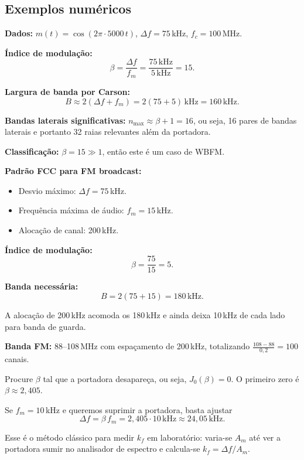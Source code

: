 \documentclass[11pt,a4paper]{article}
\begin{document}
\subsection{Exemplos numéricos}

\begin{exemplo}
\textbf{Dados:} $m(t)=\cos(2\pi\cdot 5000\,t)$, $\Delta f=75$\,kHz, $f_c=100$\,MHz.

\textbf{Índice de modulação:}
\[
  \beta = \frac{\Delta f}{f_m} = \frac{75\,\mathrm{kHz}}{5\,\mathrm{kHz}} = 15.
\]

\textbf{Largura de banda por Carson:}
\[
  B \approx 2(\Delta f + f_m) = 2(75 + 5)\,\mathrm{kHz} = 160\,\mathrm{kHz}.
\]

\textbf{Bandas laterais significativas:} $n_{\max} \approx \beta + 1 = 16$, ou seja, 16 pares de bandas laterais e portanto 32 raias relevantes além da portadora.

\textbf{Classificação:} $\beta=15\gg 1$, então este é um caso de WBFM.
\end{exemplo}

\begin{exemplo}
\textbf{Padrão FCC para FM broadcast:}
\begin{itemize}
  \item Desvio máximo: $\Delta f = 75$\,kHz.
  \item Frequência máxima de áudio: $f_m = 15$\,kHz.
  \item Alocação de canal: 200\,kHz.
\end{itemize}

\textbf{Índice de modulação:}
\[
  \beta = \frac{75}{15} = 5.
\]

\textbf{Banda necessária:}
\[
  B = 2(75+15) = 180\,\mathrm{kHz}.
\]

A alocação de 200\,kHz acomoda os 180\,kHz e ainda deixa 10\,kHz de cada lado para banda de guarda.

\textbf{Banda FM:} 88--108\,MHz com espaçamento de 200\,kHz, totalizando $\frac{108-88}{0{,}2}=100$ canais.
\end{exemplo}

\begin{exemplo}
Procure $\beta$ tal que a portadora desapareça, ou seja, $J_0(\beta)=0$. O primeiro zero é $\beta\approx 2{,}405$.

Se $f_m=10$\,kHz e queremos suprimir a portadora, basta ajustar
\[
  \Delta f = \beta\,f_m = 2{,}405\cdot 10\,\mathrm{kHz} \approx 24{,}05\,\mathrm{kHz}.
\]

Esse é o método clássico para medir $k_f$ em laboratório: varia-se $A_m$ até ver a portadora sumir no analisador de espectro e calcula-se $k_f = \Delta f / A_m$.
\end{exemplo}
\end{document}
